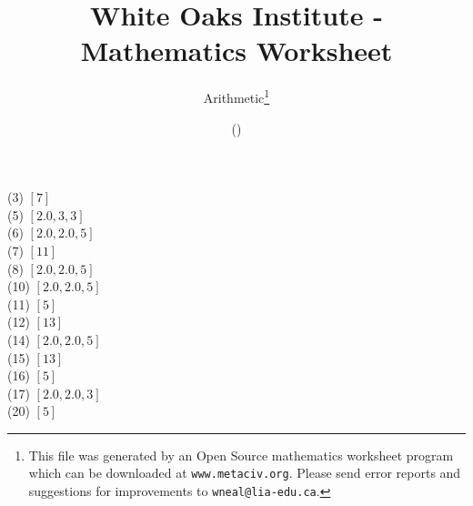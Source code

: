 \documentclass[letter]{article}
\begin{document}
\title{White Oaks Institute - Mathematics Worksheet}
\author{Arithmetic\thanks{This file was generated by an \textsf{Open Source} mathematics worksheet program which can be downloaded at \texttt{www.metaciv.org}. Please send error reports and suggestions for improvements to \texttt{wneal@lia-edu.ca}.}}
\date{\XCfileversion{} (\XCfiledate)}
\maketitle
\setlength{\parskip}{12mm plus 4mm minus 4mm}\setlength{\parindent}{0cm}\begin{multicols}{2}(3) $[7]$\\(5) $[2.0, 3, 3]$\\(6) $[2.0, 2.0, 5]$\\(7) $[11]$\\(8) $[2.0, 2.0, 5]$\\(10) $[2.0, 2.0, 5]$\\(11) $[5]$\\(12) $[13]$\\(14) $[2.0, 2.0, 5]$\\(15) $[13]$\\(16) $[5]$\\(17) $[2.0, 2.0, 3]$\\(20) $[5]$\\\end{multicols}
\end{document}
